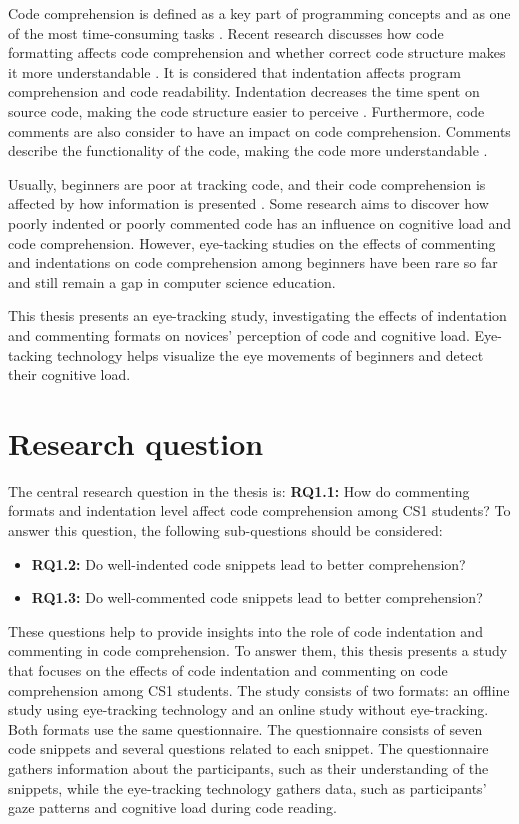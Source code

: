Code comprehension is defined as a key part of programming concepts and as one of the most time-consuming tasks \cite{javier2021understanding}.
Recent research discusses how code formatting affects code comprehension and whether correct code structure makes it more understandable \cite{andrzejewska2020development}. It is considered that indentation affects program comprehension and code readability. Indentation decreases the time spent on source code, making the code structure easier to perceive \cite{bauer2017indentations}. Furthermore, code comments are also consider to have an impact on code comprehension. Comments describe the functionality of the code, making the code more understandable \cite{bakhuizen2019comments}.
 
Usually, beginners are poor at tracking code, and their code comprehension is affected by how information is presented \cite{robins2003learning}. Some research aims to discover how poorly indented or poorly commented code has an influence on cognitive load and code comprehension.  However, eye-tacking studies on the effects of commenting and indentations on code comprehension among beginners have been rare so far and still remain a gap in computer science education.

  
This thesis presents an eye-tracking study, investigating the effects of indentation and commenting formats on novices’ perception of code and cognitive load. Eye-tacking technology helps visualize the eye movements of beginners and detect their cognitive load. 


\section{Research question}

The central research question in the thesis is: \textbf{RQ1.1:} How do commenting formats and indentation level affect code comprehension among CS1 students? To answer this question, the following sub-questions should be considered:

\begin{itemize}
    \item \textbf{RQ1.2:} Do well-indented code snippets lead to better comprehension?
    \item \textbf{RQ1.3:} Do well-commented code snippets lead to better comprehension?

\end{itemize}

These questions help to provide insights into the role of code indentation and commenting in code comprehension. 
To answer them, this thesis presents a study that focuses on the effects of code indentation and commenting on code comprehension among CS1 students.
The study consists of two formats: an offline study using eye-tracking technology and an online study without eye-tracking. Both formats use the same questionnaire. The questionnaire consists of seven code snippets and several questions related to each snippet. The questionnaire gathers information about the participants, such as their understanding of the snippets, while the eye-tracking technology gathers data, such as participants’ gaze patterns and cognitive load during code reading.  

